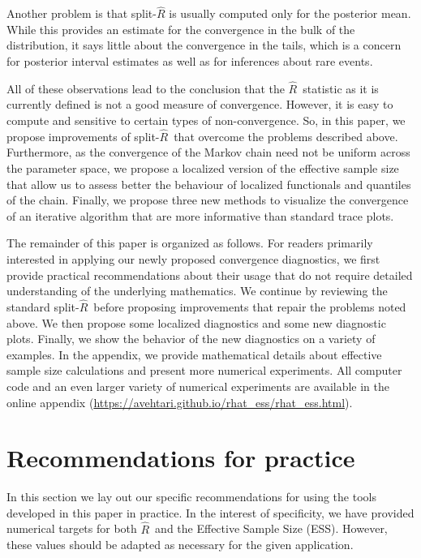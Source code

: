 \documentclass[american,]{article}
\newcommand{\Rhat}{$\widehat{R}$}
\newcommand{\sRhat}{split-$\widehat{R}$}
\theoremstyle{definition}
\begin{document}
Another problem is that split-\(\widehat{R}\) is
usually computed only for the posterior mean. While this provides an estimate 
for the convergence in the bulk of the distribution, it says little about the 
convergence in the tails, which is a concern for posterior 
interval estimates as well as for inferences about rare events.
 
All of these observations lead to the conclusion that the \Rhat\ statistic 
as it is currently defined is not a good measure of convergence. However, it is 
easy to compute and sensitive to certain types of non-convergence. So, 
in this paper, we propose improvements of \sRhat\ that overcome the  
problems described above. Furthermore, as the convergence
of the Markov chain need not be uniform across the parameter space, we
propose a localized version of the effective sample size
that allow us to assess better the behaviour of localized 
functionals and quantiles of the chain. Finally, we propose three new methods to visualize the 
convergence of an iterative algorithm that are more informative than standard 
trace plots.

The remainder of this paper is organized as follows. 
For readers primarily interested in applying our newly proposed convergence 
diagnostics, we first provide practical recommendations about their usage
that do not require detailed understanding of the underlying mathematics.
We continue by reviewing the standard 
\sRhat\, before proposing improvements that repair the problems noted above. 
We then propose some localized diagnostics and some new diagnostic plots. 
Finally, we show the behavior of the new diagnostics on a variety of examples.
In the appendix, we provide mathematical details about effective sample size 
calculations and present more numerical experiments. All computer code and an 
even larger variety of numerical experiments are available in the online 
appendix (\url{https://avehtari.github.io/rhat_ess/rhat_ess.html}).



\section{Recommendations for practice}
In this section we lay out our specific recommendations for using the tools 
developed in this paper in practice. In the interest of specificity, we have 
provided numerical targets for both \Rhat\ and the Effective Sample Size (ESS). 
However, these values should be adapted as necessary for the given application.
\end{document}
